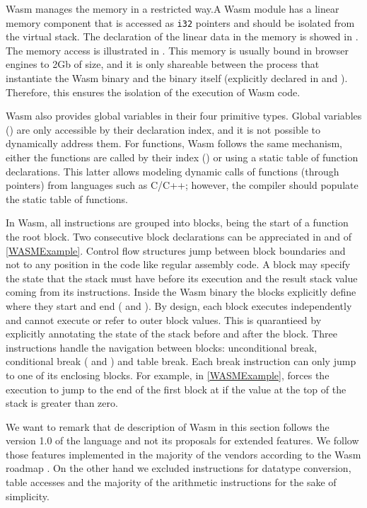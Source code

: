 Wasm manages the memory in a restricted way.A Wasm module has a linear memory component that is accessed as \texttt{i32} pointers and should be isolated from the virtual stack. The declaration of the linear data in the memory is showed in . The memory access is illustrated in . This memory is usually bound in browser engines to 2Gb of size, and it is only shareable between the process that instantiate the Wasm binary and the binary itself (explicitly declared in  and ). Therefore, this ensures the isolation of the execution of Wasm code. 

Wasm also provides global variables in their four primitive types. Global variables () are only accessible by their declaration index, and it is not possible to dynamically address them. For functions, Wasm follows the same mechanism, either the functions are called by their index () or using a static table of function declarations. This latter allows modeling dynamic calls of functions (through pointers) from languages such as C/C++; however, the compiler should populate the static table of functions.


In Wasm, all instructions are grouped into blocks, being the start of a function the root block. Two consecutive block declarations can be appreciated in  and  of \autoref{WASMExample}. Control flow structures jump between block boundaries and not to any position in the code like regular assembly code. A block may specify the state that the stack must have before its execution and the result stack value coming from its instructions. Inside the Wasm binary the blocks explicitly define where they start and end ( and ). By design, each block executes independently and cannot execute or refer to outer block values. This is quarantieed by explicitly annotating the state of the stack before and after the block. Three instructions handle the navigation between blocks: unconditional break, conditional break ( and ) and table break. Each break instruction can only jump to one of its enclosing blocks. For example, in \autoref{WASMExample},  forces the execution to jump to the end of the first block at  if the value at the top of the stack is greater than zero.

We want to remark that de description of Wasm in this section follows the version 1.0 of the language and not its proposals for extended features. We follow those features implemented in the majority of the vendors according to the Wasm roadmap \cite{wasm_roadmap}. On the other hand we excluded instructions for datatype conversion, table accesses and the majority of the arithmetic instructions for the sake of simplicity.

